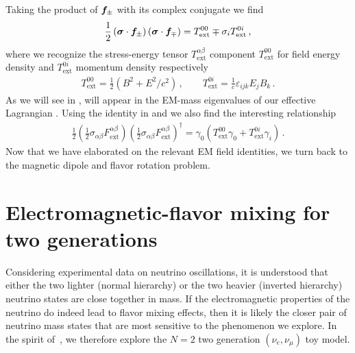 Taking the product of $\boldsymbol{f}_{\pm}$ with its complex conjugate we find
\begin{align}
\label{cross:1}
\frac{1}{2}\left(\boldsymbol{\sigma}\cdot\boldsymbol{f}_{\pm}\right)\left(\boldsymbol{\sigma}\cdot\boldsymbol{f}_{\mp}\right)=T_\mathrm{ext}^{00}\mp \sigma_{i}T_\mathrm{ext}^{0i}\,,
\end{align}
where we recognize the stress-energy tensor $T_\mathrm{ext}^{\alpha\beta}$ component $T_\mathrm{ext}^{00}$ for field energy density and $T_\mathrm{ext}^{0i}$ momentum density respectively
\begin{align}
T_\mathrm{ext}^{00}=\frac{1}{2}\left(B^{2}+E^{2}/c^{2}\right)\,,\qquad
T_\mathrm{ext}^{0i}=\frac{1}{c}\varepsilon_{ijk}E_{j}B_{k}\,.
\end{align}
As we will see in ,  will appear in the EM-mass eigenvalues of our effective Lagrangian . Using the identity in  and  we also find the interesting relationship
\begin{align}
\label{cross:2}
\frac{1}{2}\left(\frac{1}{2}\sigma_{\alpha\beta}F^{\alpha\beta}_\mathrm{ext}\right)\left(\frac{1}{2}\sigma_{\alpha\beta}F^{\alpha\beta}_\mathrm{ext}\right)^{\dag}=
\gamma_{0}\left(T_\mathrm{ext}^{00}\gamma_{0}+T_\mathrm{ext}^{0i}\gamma_{i}\right)\,.
\end{align}
Now that we have elaborated on the relevant EM field identities, we turn back to the magnetic dipole and flavor rotation problem.

\section{Electromagnetic-flavor mixing for two generations}
\label{sec:nutoy}
Considering experimental data on neutrino oscillations, it is understood that either the two lighter (normal hierarchy) or the two heavier (inverted hierarchy) neutrino states are close together in mass. If the electromagnetic properties of the neutrino do indeed lead to flavor mixing effects, then it is likely the closer pair of neutrino mass states that are most sensitive to the phenomenon we explore. In the spirit of~\cite{Bethe:1986ej}, we therefore explore the $N=2$ two generation $(\nu_{e},\nu_{\mu})$ toy model.

